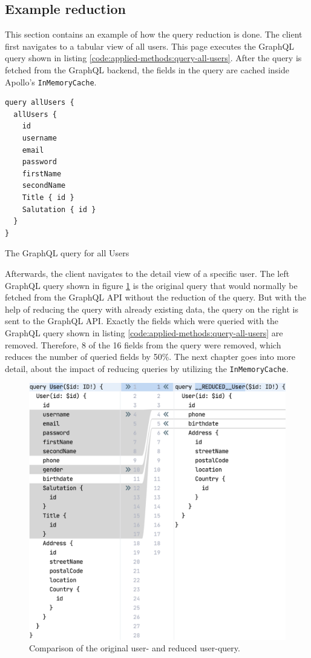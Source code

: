 \subsection{Example reduction}\label{subsection:background:graphql:example-reduction}

This section contains an example of how the query reduction is done. The client first navigates to a tabular view of all users. This page executes the GraphQL query shown in listing \ref{code:applied-methods:query-all-users}. After the query is fetched from the GraphQL backend, the fields in the query are cached inside Apollo's \texttt{InMemoryCache}.

\ifshowListings
\begin{listing}[H]
\begin{verbatim}
query allUsers {
  allUsers {
    id
    username
    email
    password
    firstName
    secondName
    Title { id }
    Salutation { id }
  }
}
\end{verbatim}
\caption{The GraphQL query for all Users}\label{code:applied-methods:query-all-users}
\end{listing}
\fi

\noindent Afterwards, the client navigates to the detail view of a specific user. The left GraphQL query shown in figure \ref{fig:applied-methods:comparison-user-reduced-user} is the original query that would normally be fetched from the GraphQL \ac{API} without the reduction of the query. But with the help of reducing the query with already existing data, the query on the right is sent to the GraphQL \ac{API}. Exactly the fields which were queried with the GraphQL query shown in listing \ref{code:applied-methods:query-all-users} are removed. Therefore, 8 of the 16 fields from the query were removed, which reduces the number of queried fields by 50\%. The next chapter goes into more detail, about the impact of reducing queries by utilizing the \texttt{InMemoryCache}.

\ifshowImages
  \begin{figure}[H]
  \centering
  \includegraphics[width=0.7\linewidth]{images/reduction-graphql-examples/compare-user-reduced-user.png}
  \caption{Comparison of the original user- and reduced user-query.}\label{fig:applied-methods:comparison-user-reduced-user}
  \end{figure}
\fi
